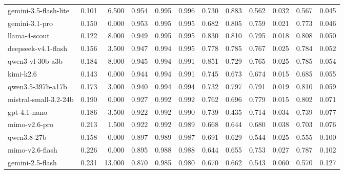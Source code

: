 \begin{table}
\begin{tabular}{lrrrrrrrrrrr}
gemini-3.5-flash-lite & 0.101 & 6.500 & 0.954 & 0.995 & 0.996 & 0.730 & 0.883 & 0.562 & 0.032 & 0.567 & 0.045 \\
gemini-3.1-pro & 0.150 & 0.000 & 0.953 & 0.995 & 0.995 & 0.682 & 0.805 & 0.759 & 0.021 & 0.773 & 0.046 \\
llama-4-scout & 0.122 & 8.000 & 0.949 & 0.995 & 0.995 & 0.830 & 0.810 & 0.795 & 0.018 & 0.808 & 0.050 \\
deepseek-v4.1-flash & 0.156 & 3.500 & 0.947 & 0.994 & 0.995 & 0.778 & 0.785 & 0.767 & 0.025 & 0.784 & 0.052 \\
qwen3-vl-30b-a3b & 0.184 & 8.000 & 0.945 & 0.994 & 0.991 & 0.851 & 0.729 & 0.765 & 0.025 & 0.785 & 0.054 \\
kimi-k2.6 & 0.143 & 0.000 & 0.944 & 0.994 & 0.991 & 0.745 & 0.673 & 0.674 & 0.015 & 0.685 & 0.055 \\
qwen3.5-397b-a17b & 0.173 & 3.000 & 0.940 & 0.994 & 0.994 & 0.732 & 0.797 & 0.791 & 0.019 & 0.810 & 0.059 \\
mistral-small-3.2-24b & 0.190 & 0.000 & 0.927 & 0.992 & 0.992 & 0.762 & 0.696 & 0.779 & 0.015 & 0.802 & 0.071 \\
gpt-4.1-nano & 0.186 & 3.500 & 0.922 & 0.992 & 0.990 & 0.739 & 0.435 & 0.714 & 0.034 & 0.739 & 0.077 \\
mimo-v2.6-pro & 0.213 & 1.500 & 0.922 & 0.992 & 0.989 & 0.668 & 0.644 & 0.680 & 0.038 & 0.703 & 0.076 \\
qwen3.8-27b & 0.158 & 0.000 & 0.897 & 0.989 & 0.987 & 0.691 & 0.629 & 0.544 & 0.025 & 0.555 & 0.100 \\
mimo-v2.6-flash & 0.226 & 0.000 & 0.895 & 0.988 & 0.988 & 0.644 & 0.655 & 0.753 & 0.027 & 0.787 & 0.102 \\
gemini-2.5-flash & 0.231 & 13.000 & 0.870 & 0.985 & 0.980 & 0.670 & 0.662 & 0.543 & 0.060 & 0.570 & 0.127 \\
\bottomrule
\end{tabular}
\end{table}
